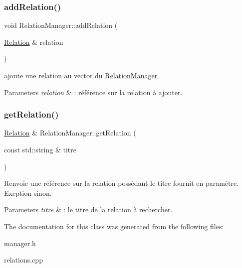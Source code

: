 \subsubsection{\texorpdfstring{add\+Relation()}{addRelation()}}
{\footnotesize\ttfamily void Relation\+Manager\+::add\+Relation (\begin{DoxyParamCaption}\item[{\hyperlink{class_relation}{Relation} \&}]{relation }\end{DoxyParamCaption})}



ajoute une relation au vector du \hyperlink{class_relation_manager}{Relation\+Manager} 


\begin{DoxyParams}{Parameters}
{\em relation} & \+: référence sur la relation à ajouter. \\
\hline
\end{DoxyParams}
\mbox{\label{class_relation_manager_a7e5900e270c2249831355c70b2fd94b8}} 
\subsubsection{\texorpdfstring{get\+Relation()}{getRelation()}}
{\footnotesize\ttfamily \hyperlink{class_relation}{Relation} \& Relation\+Manager\+::get\+Relation (\begin{DoxyParamCaption}\item[{const std\+::string \&}]{titre }\end{DoxyParamCaption})}



Renvoie une référence sur la relation possédant le titre fournit en paramètre. Exeption sinon. 


\begin{DoxyParams}{Parameters}
{\em titre} & \+: le titre de la relation à rechercher. \\
\hline
\end{DoxyParams}


The documentation for this class was generated from the following files\+:\begin{DoxyCompactItemize}
\item 
manager.\+h\item 
relations.\+cpp\end{DoxyCompactItemize}
